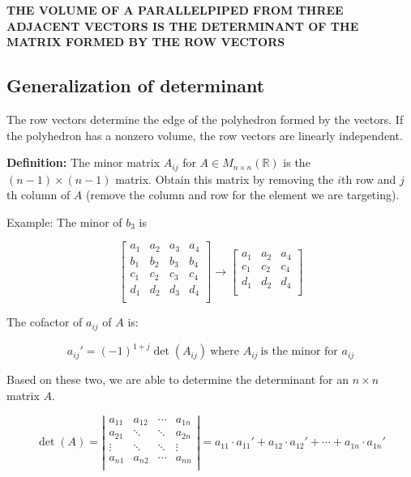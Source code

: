 \documentclass[12pt]{article}
\theoremstyle{plain}
\theoremstyle{remark}
\theoremstyle{definition}
\begin{document}
\textbf{THE VOLUME OF A PARALLELPIPED FROM THREE ADJACENT VECTORS IS THE
DETERMINANT OF THE MATRIX FORMED BY THE ROW VECTORS}


\subsection{Generalization of
determinant}

The row vectors determine the edge of the polyhedron formed by the
vectors. If the polyhedron has a nonzero volume, the row vectors are
linearly independent.

\textbf{Definition:} The minor matrix \(A_{ij}\) for
\(A \in M_{n \times n}\left( \mathbb{R} \right)\) is the
\((n - 1) \times (n - 1)\) matrix. Obtain this matrix by removing the
\(i\)th row and \(j\)th column of \(A\) (remove the column and row for
the element we are targeting).

Example: The minor of \(b_{3}\) is

\[\begin{bmatrix}
a_{1} & a_{2} & a_{3} & a_{4} \\
b_{1} & b_{2} & b_{3} & b_{4} \\
c_{1} & c_{2} & c_{3} & c_{4} \\
d_{1} & d_{2} & d_{3} & d_{4} \\
\end{bmatrix} \rightarrow \begin{bmatrix}
a_{1} & a_{2} & a_{4} \\
c_{1} & c_{2} & c_{4} \\
d_{1} & d_{2} & d_{4} \\
\end{bmatrix}\]

The cofactor of \(a_{ij}\) of \(A\) is:

\[{a_{ij}' }{= ( - 1)^{1 + j}\det\left( A_{ij} \right)\ \text{where\ }A_{ij}\ \text{is\ the\ minor\ for\ }a_{ij}} \]

Based on these two, we are able to determine the determinant for an
\(n \times n\) matrix \(A\).

\[{\det(A) = \left| \begin{matrix}
a_{11} & a_{12} & \cdots & a_{1n} \\
a_{21} & \ddots & \ddots & a_{2n} \\
 \vdots & \ddots & \ddots & \vdots \\
a_{n1} & a_{n2} & \cdots & a_{nn} \\
\end{matrix} \right| }{= a_{11} \cdot a_{11}' + a_{12} \cdot a_{12}' + \cdots + a_{1n} \cdot a_{1n}'} \]
\end{document}
